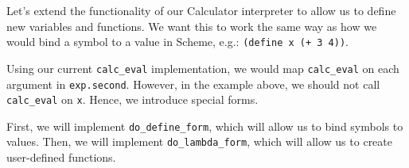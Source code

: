 Let's extend the functionality of our Calculator interpreter to allow us to
define new variables and functions. We want this to work the same way as how we
would bind a symbol to a value in Scheme, e.g.: {\tt (define x (+ 3 4))}.

Using our current {\tt calc\_eval} implementation, we would map {\tt calc\_eval}
on each argument in {\tt exp.second}. However, in the example above, we should
not call {\tt calc\_eval} on {\tt x}. Hence, we introduce special forms.

First, we will implement {\tt do\_define\_form}, which will allow us to bind
symbols to values. Then, we will implement {\tt do\_lambda\_form}, which will allow us
to create user-defined functions.

